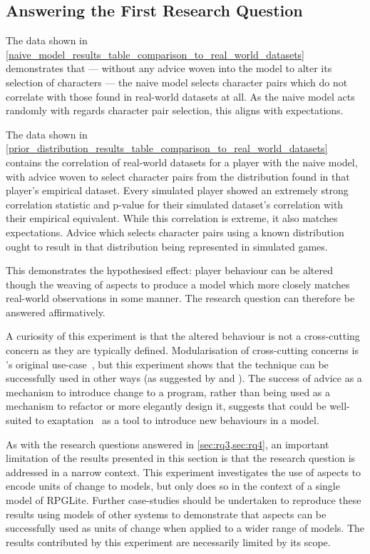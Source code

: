 \subsection{Answering the First Research Question}

The data shown in
\cref{naive_model_results_table_comparison_to_real_world_datasets} demonstrates
that --- without any advice woven into the model to alter its selection of
characters --- the naive model selects character pairs which do not correlate
with those found in real-world datasets at all. As the naive model acts randomly
with regards character pair selection, this aligns with expectations.

The data shown in
\cref{prior_distribution_results_table_comparison_to_real_world_datasets}
contains the correlation of real-world datasets for a player with the naive
model, with advice woven to select character pairs from the distribution found
in that player's empirical dataset. Every simulated player showed an
extremely strong correlation statistic and p-value for their simulated dataset's
correlation with their empirical equivalent. While this correlation is extreme,
it also matches expectations. Advice which selects character pairs using a known
distribution ought to result in that distribution being represented in
simulated games.

This demonstrates the hypothesised effect: player behaviour can be altered
though the weaving of aspects to produce a model which more closely matches
real-world observations in some manner. The research question can therefore be
answered affirmatively.

A curiosity of this experiment is that the altered behaviour is not a
cross-cutting concern as they are typically defined. Modularisation of
cross-cutting concerns is \aop{}'s original use-case~\cite{kiczales1997aspect},
but this experiment shows that the technique can be successfully used in other
ways (as suggested by \citet{gulyas1999use} and \citet{steimann06paradoxical}).
The success of advice as a mechanism to introduce change to a program, rather
than being used as a mechanism to refactor or more elegantly design it, suggests
that \aop{} could be well-suited to exaptation~\cite{exaptation_origin} as a
tool to introduce new behaviours in a model.

As with the research questions answered in \cref{sec:rq3,sec:rq4}, an important
limitation of the results presented in this section is that the research
question is addressed in a narrow context. This experiment investigates the use
of aspects to encode units of change to models, but only does so in the context
of a single model of RPGLite. Further case-studies should be undertaken to
reproduce these results using models of other systems to demonstrate that
aspects can be successfully used as units of change when applied to a wider
range of models. The results contributed by this experiment are necessarily
limited by its scope.




